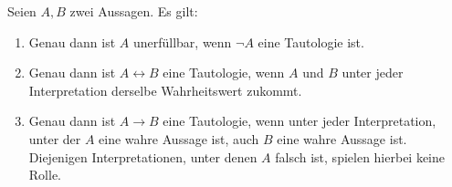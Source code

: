  
\begin{satz} \label{tauto}
    Seien $A,B$ zwei Aussagen. Es gilt:
    \begin{enumerate}
        \item Genau dann ist $A$ unerfüllbar, wenn $\neg A$ eine Tautologie ist.
        \item Genau dann ist $A\leftrightarrow B$ eine Tautologie, wenn $A$ und $B$ unter jeder Interpretation derselbe Wahrheitswert zukommt.
        \item Genau dann ist $A\to B$ eine Tautologie, wenn unter jeder Interpretation, unter der $A$ eine wahre Aussage ist, auch $B$ eine wahre Aussage ist. Diejenigen Interpretationen, unter denen $A$ falsch ist, spielen hierbei keine Rolle.
    \end{enumerate}
\end{satz}
